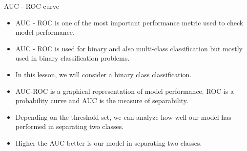 \documentclass[11pt]{beamer}
\begin{document}
\begin{frame}{AUC - ROC curve}
	\begin{itemize}
		\item AUC - ROC is one of the most important performance metric used to check model performance. 
		\item AUC - ROC is used for binary and also multi-class classification but mostly used in binary classification problems. 
		\item In this lesson, we will consider a binary class classification.
		\item AUC-ROC is a graphical representation of model performance. ROC is a probability curve and AUC is the measure of separability. 
		\item Depending on the threshold set, we can analyze how well our model has performed in separating two classes. 
		\item Higher the AUC better is our model in separating two classes.
	\end{itemize}
\end{frame}
\end{document}
